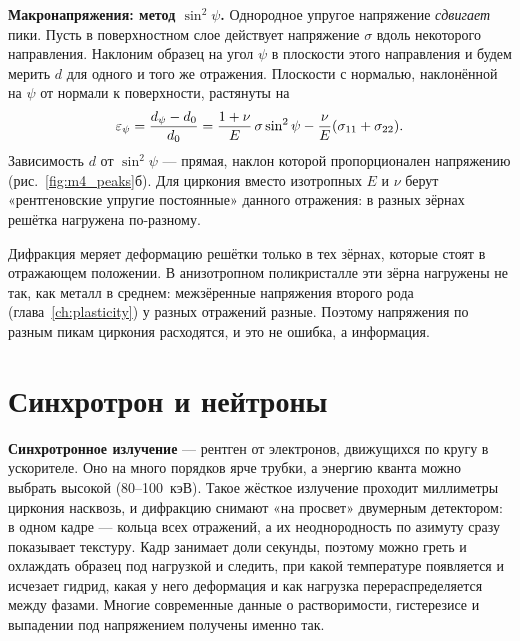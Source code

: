\textbf{Макронапряжения: метод $\sin^2\psi$.} Однородное упругое напряжение \emph{сдвигает} пики. Пусть в поверхностном
слое действует напряжение $\sigma$ вдоль некоторого направления. Наклоним образец на угол $\psi$ в плоскости этого
направления и будем мерить $d$ для одного и того же отражения. Плоскости с нормалью, наклонённой на $\psi$ от нормали к
поверхности, растянуты на
\begin{equation}
\varepsilon_\psi = \frac{d_\psi - d_0}{d_0} = \frac{1+\nu}{E}\,\sigma\sin^2\psi - \frac{\nu}{E}(\sigma_{11}+\sigma_{22}).
\end{equation}
Зависимость $d$ от $\sin^2\psi$ --- прямая, наклон которой пропорционален напряжению (рис.~\ref{fig:m4_peaks}б).
Для циркония вместо изотропных $E$ и $\nu$ берут «рентгеновские упругие постоянные» данного отражения: в разных
зёрнах решётка нагружена по-разному.


\begin{warnbox}
Дифракция меряет деформацию решётки только в тех зёрнах, которые стоят в отражающем положении. В анизотропном
поликристалле эти зёрна нагружены не так, как металл в среднем: межзёренные напряжения второго рода
(глава~\ref{ch:plasticity}) у разных отражений разные. Поэтому напряжения по разным пикам циркония расходятся, и
это не ошибка, а информация.
\end{warnbox}

\section{Синхротрон и нейтроны}\label{sec:synchro}

\textbf{Синхротронное излучение} --- рентген от электронов, движущихся по кругу в ускорителе. Оно на много порядков ярче
трубки, а энергию кванта можно выбрать высокой (80--100~кэВ). Такое жёсткое излучение проходит миллиметры циркония
насквозь, и дифракцию снимают «на просвет» двумерным детектором: в одном кадре --- кольца всех отражений, а их
неоднородность по азимуту сразу показывает текстуру. Кадр занимает доли секунды, поэтому можно греть и охлаждать
образец под нагрузкой и следить, при какой температуре появляется и исчезает гидрид, какая у него деформация и как
нагрузка перераспределяется между фазами. Многие современные данные о растворимости, гистерезисе и выпадении под
напряжением получены именно так.

